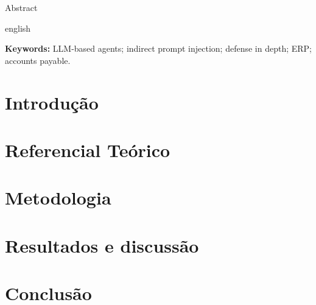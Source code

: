 \documentclass[12pt,a4paper,oneside]{article}
\begin{document}
\begin{center}
  {\fontsize{14}{16}\selectfont Abstract}
\end{center}
\begin{itshape}
  \begin{otherlanguage*}{english}
    
  \end{otherlanguage*}
\end{itshape}

\vspace{0.45cm}
\noindent\textbf{Keywords:} LLM-based agents; indirect prompt injection; defense in depth; ERP; accounts payable.

\vspace{0.75cm}

\section{Introdução}


\section{Referencial Teórico}


\section{Metodologia}


\section{Resultados e discussão}


\section{Conclusão}


\renewcommand{\refname}{6. Referências bibliográficas}



\ifdefined\tccannex

\fi
\end{document}
